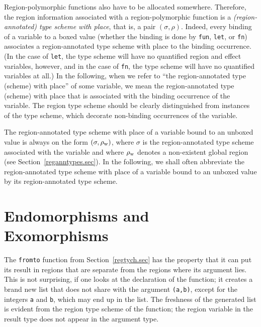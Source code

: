 \documentclass[12pt]{book}
\newcommand{\rhoword}{\rho_{\rm w}}
\begin{document}
%
%
Region-polymorphic functions also have to be allocated somewhere.
Therefore, the region information associated with a region-polymorphic
function is a {\em (region-annotated) type scheme with place}, that
is, a pair $(\sigma,\rho)$.  Indeed, every binding of a variable to a
boxed value (whether the binding is done by {\tt fun}, {\tt let}, or
{\tt fn}) associates a region-annotated type scheme with place to the
binding occurrence.  (In the case of {\tt let}, the type scheme will
have no quantified region and effect variables, however, and in the
case of {\tt fn}, the type scheme will have no quantified variables at
all.)  In the following, when we refer to ``the region-annotated type
(scheme) with place'' of some variable, we mean the region-annotated
type (scheme) with place that is associated with the binding
occurrence of the variable. The region type scheme should be clearly
distinguished from instances of the type scheme, which decorate
non-binding occurrences of the variable.

The region-annotated type scheme with place of a variable bound to an
unboxed value is always on the form $(\sigma,\rhoword)$, where
$\sigma$ is the region-annotated type scheme associated with the
variable and where $\rhoword$ denotes a non-existent global region
(see Section~\ref{reganntypes.sec}). In the following, we shall often
abbreviate the region-annotated type scheme with place of a variable
bound to an unboxed value by its region-annotated type scheme.

\section{Endomorphisms and Exomorphisms}
The {\tt fromto} function from Section~\ref{regtych.sec} has the
property that it can put its result in regions that are separate from
the regions where its argument lies. This is not surprising, if one
looks at the declaration of the function; it creates a brand new list
that does not share with the argument {\tt (a,b)}, except for the
integers {\tt a} and {\tt b}, which may end up in the list.  The
freshness of the generated list is evident from the region type scheme
of the function; the region variable in the result type does not
appear in the argument type.
\end{document}
